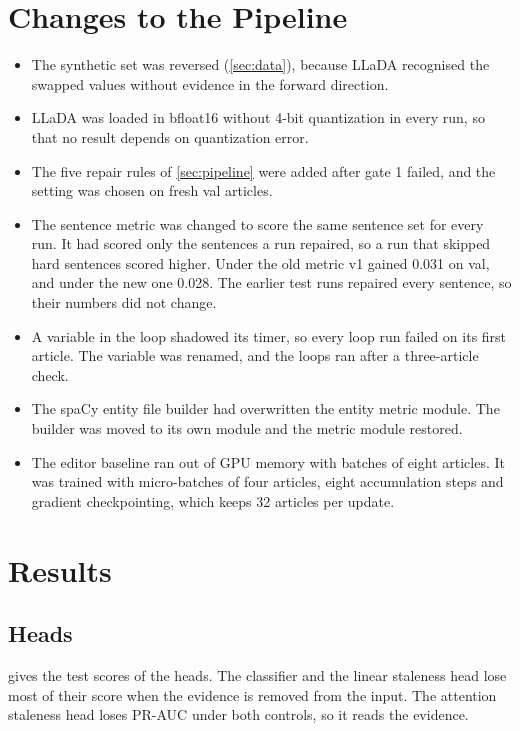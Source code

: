 \documentclass[]{paper}
\begin{document}
\section{Changes to the Pipeline}
\label{sec:changes}

\begin{itemize}
\item The synthetic set was reversed (\cref{sec:data}), because LLaDA recognised the swapped values without evidence in the forward direction.
\item LLaDA was loaded in bfloat16 without 4-bit quantization in every run, so that no result depends on quantization error.
\item The five repair rules of \cref{sec:pipeline} were added after gate 1 failed, and the setting was chosen on fresh val articles.
\item The sentence metric was changed to score the same sentence set for every run. It had scored only the sentences a run repaired, so a run that skipped hard sentences scored higher. Under the old metric v1 gained 0.031 on val, and under the new one 0.028. The earlier test runs repaired every sentence, so their numbers did not change.
\item A variable in the loop shadowed its timer, so every loop run failed on its first article. The variable was renamed, and the loops ran after a three-article check.
\item The spaCy entity file builder had overwritten the entity metric module. The builder was moved to its own module and the metric module restored.
\item The editor baseline ran out of GPU memory with batches of eight articles. It was trained with micro-batches of four articles, eight accumulation steps and gradient checkpointing, which keeps 32 articles per update.
\end{itemize}

\section{Results}
\label{sec:results}

\subsection{Heads}

 gives the test scores of the heads. The classifier and the linear staleness head lose most of their score when the evidence is removed from the input. The attention staleness head loses PR-AUC under both controls, so it reads the evidence.
\end{document}
